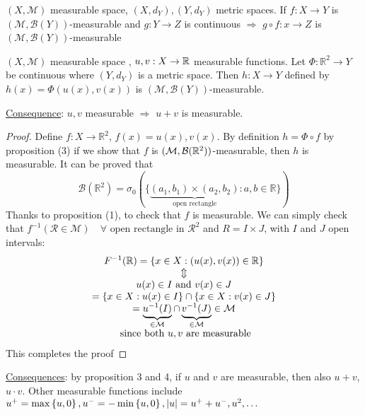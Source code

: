 \begin{proposition}
    \((X, \mathcal{M})\) measurable space, \((X, d_Y), (Y, d_Y)\) metric spaces. 
    If \(f: X \to Y\) is \((\mathcal{M}, \mathcal{B}(Y))\)-measurable and \(g : Y \to Z\) is continuous \(\Rightarrow\) \(g \circ f : x \to Z\) is \((\mathcal{M}, \mathcal{B}(Y))\)-measurable
\end{proposition}
\begin{proposition}
    \((X, \mathcal{M})\) measurable space , \(u,v : X \to  \mathbb{R}\) measurable functions.
    Let \(\Phi : \mathbb{R}^2 \to Y\) be continuous where \((Y, d_Y)\) is a metric space. Then \(h: X\to Y\) defined by \(h(x) = \Phi(u(x), v(x))\) is \((\mathcal{M}, \mathcal{B}(Y))\)-measurable.
\end{proposition}
\underline{Consequence}: \(u, v\) measurable \(\Rightarrow\) \(u+v\) is measurable.
\begin{proof}
    Define \(f: X \to \mathbb{R}^2\), \(f(x) = u(x), v(x)\). By definition \(h = \Phi \circ f\) by proposition (3) if we show that \(f\) is \((\mathcal{M},\mathcal{B}(\mathbb{R}^2))\)-measurable, then \(h\) is measurable. It can be proved that \[\mathcal{B}(\mathbb{R}^2) = \sigma_0 (\lbrace \underbrace{(a_1, b_1) \times (a_2, b_2)}_{\mbox{open rectangle}}: a,b \in \mathbb{R}\rbrace)\]
    Thanks to proposition (1), to check that \(f\) is measurable. We can simply check that
    \(f^{-1}(\mathcal{R} \in \mathcal{M}) \quad \forall \mbox{ open rectangle in }\mathcal{R}^2\) and
    \(R = I \times J\), with \(I\) and \(J\) open intervals:
    \[
        \begin{array}{c}
            F^{-1}(\mathbb{R}) = \left\lbrace x \in X : (u(x), v(x)) \in \mathbb{R} \right\rbrace \\
            \Updownarrow \\
            u(x) \in I \mbox{ and } v(x) \in J \\
            = \left\{ x \in X : u(x) \in I \right\} \cap \left\{ x \in X : v(x) \in J \right\} \\
            = \underbrace{u^{-1}(I)}_{\in \mathcal{M}} \cap \underbrace{v^{-1}(J)}_{\in \mathcal{M}} \in \mathcal{M} \\
            \mbox{ since both }u,v \mbox{ are measurable}
        \end{array}
    \]
    This completes the proof
\end{proof}
\underline{Consequences}: by proposition 3 and 4, if \(u\) and \(v\) are measurable, then also \(u+v\), \(u \cdot v\). Other measurable functions include \(u^+ = \max\left\{ u, 0 \right\}, u^- =- \min\left\{u,0\right\}, \abs{u} = u^+ + u^-, u^2, \ldots\)

